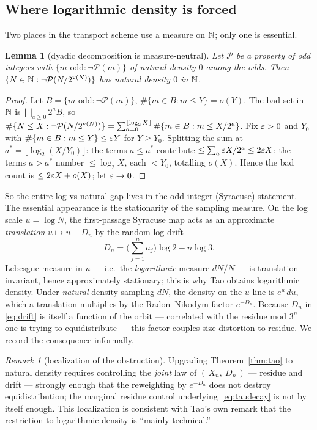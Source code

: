 \documentclass[11pt]{amsart}
\newtheorem{lemma}[theorem]{Lemma}
\theoremstyle{definition}
\theoremstyle{remark}
\newtheorem{remark}[theorem]{Remark}
\begin{document}
\subsection{Where logarithmic density is forced}
\label{subsec:localization}
Two places in the transport scheme use a measure on $\mathbb{N}$; only one is essential.

\begin{lemma}[dyadic decomposition is measure-neutral]\label{lem:dyadic}
Let $\mathcal P$ be a property of odd integers with $\{m \text{ odd}:\neg\mathcal P(m)\}$ of natural
density $0$ among the odds. Then $\{N\in\mathbb{N}:\neg\mathcal P(N/2^{\operatorname{v}(N)})\}$ has natural density $0$
in $\mathbb{N}$.
\end{lemma}
\begin{proof}
Let $B=\{m\text{ odd}:\neg\mathcal P(m)\}$, $\#\{m\in B:m\le Y\}=o(Y)$. The bad set in $\mathbb{N}$ is
$\bigsqcup_{a\ge0}2^a B$, so
$\#\{N\le X:\neg\mathcal P(N/2^{\operatorname{v}(N)})\}=\sum_{a=0}^{\lfloor\log_2 X\rfloor}\#\{m\in B:m\le X/2^a\}$.
Fix $\varepsilon>0$ and $Y_0$ with $\#\{m\in B:m\le Y\}\le \varepsilon Y$ for $Y\ge Y_0$. Splitting the sum at
$a^*=\lfloor\log_2(X/Y_0)\rfloor$: the terms $a\le a^*$ contribute $\le \sum_a \varepsilon X/2^a\le 2\varepsilon X$;
the terms $a>a^*$ number $\le\log_2 X$, each $<Y_0$, totalling $o(X)$. Hence the bad count is
$\le 2\varepsilon X+o(X)$; let $\varepsilon\to0$.
\end{proof}

So the entire log-vs-natural gap lives in the odd-integer (Syracuse) statement.
The essential appearance is the stationarity of the sampling measure. On the log scale $u=\log N$, the
first-passage Syracuse map acts as an approximate \emph{translation} $u\mapsto u-D_n$ by the random
log-drift
\begin{equation}
  D_n=\Big(\sum_{j=1}^n a_j\Big)\log 2-n\log 3.
  \label{eq:drift}
\end{equation}
Lebesgue measure in $u$ --- i.e.\ the \emph{logarithmic} measure $dN/N$ --- is translation-invariant,
hence approximately stationary; this is why Tao obtains logarithmic density. Under \emph{natural}-density
sampling $dN$, the density on the $u$-line is $e^u\,du$, which a translation multiplies by the
Radon--Nikodym factor $e^{-D_n}$. Because $D_n$ in \eqref{eq:drift} is itself a function of the orbit ---
correlated with the residue mod $3^n$ one is trying to equidistribute --- this factor couples
size-distortion to residue. We record the consequence informally.

\begin{remark}[localization of the obstruction]\label{rem:localization}
Upgrading Theorem~\ref{thm:tao} to natural density requires controlling the \emph{joint} law of
$(\,X_n,\ D_n\,)$ --- residue and drift --- strongly enough that the reweighting by $e^{-D_n}$ does not
destroy equidistribution; the marginal residue control underlying~\eqref{eq:taudecay} is not by itself
enough. This localization is consistent with Tao's own remark that the restriction to logarithmic
density is ``mainly technical.''
\end{remark}
\end{document}
